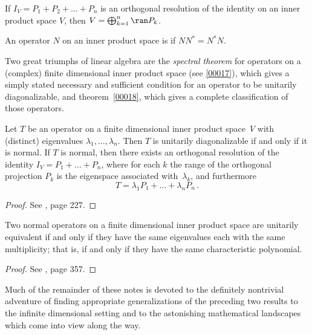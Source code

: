\begin{prop} If $I_V = P_1 + P_2 + \dots + P_n$ is an orthogonal resolution of the identity
on an inner product space $V$, then $V = \bigoplus_{k=1}^n \ran P_k$.
\end{prop}

\begin{defn} An operator $N$ on an inner product space is
 if $NN^* = N^*N$.
\end{defn}

Two great triumphs of linear algebra are the \emph{spectral theorem} for operators on a
(complex) finite dimensional inner product space (see \ref{00017}), which gives a simply
stated necessary and sufficient condition for an operator to be unitarily diagonalizable,
and theorem~\ref{00018}, which gives a complete classification of those operators.

\begin{thm}\label{00017}
Let $T$ be an operator on a finite dimensional inner product space~$V$ with (distinct)
eigenvalues $\lambda_1, \dots, \lambda_n$.  Then $T$ is unitarily diagonalizable if and
only if it is normal.  If $T$ is normal, then there exists an orthogonal resolution of
the identity $I_V = P_1 + \dots + P_n$, where for each $k$ the range of the orthogonal
projection $P_k$ is the eigenspace associated with~$\lambda_k$, and furthermore
     \[ T = \lambda_1P_1 +\dots + \lambda_nP_n\,. \]
\end{thm}

\begin{proof}  See \cite{Roman:2005}, page 227. \ns
\end{proof}

\begin{thm}\label{00018} Two normal operators on a finite dimensional inner product space
are unitarily equivalent if and only if they have the same eigenvalues each with the same
multiplicity; that is, if and only if they have the same characteristic polynomial.
\end{thm}

\begin{proof} See \cite{HoffmanK:1971}, page 357.   \ns
\end{proof}

Much of the remainder of these notes is devoted to the definitely nontrivial adventure of finding
appropriate generalizations of the preceding two results to the infinite dimensional
setting and to the astonishing mathematical landscapes which come into view along the way.

